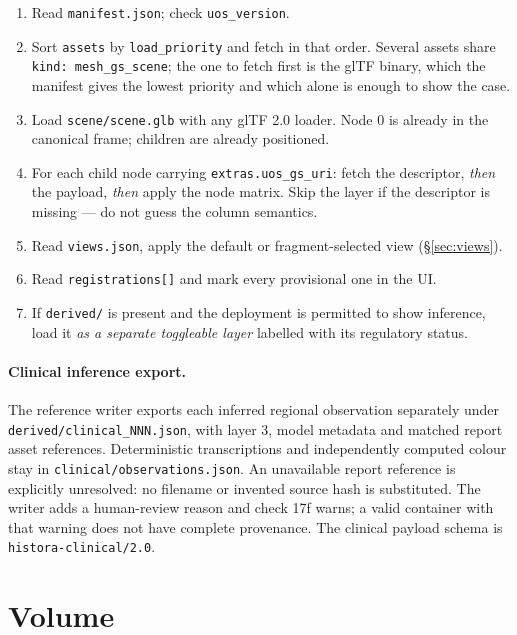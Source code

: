 \documentclass[11pt,a4paper]{article}
\newcommand{\code}[1]{\texttt{\small #1}}
\begin{document}
\begin{enumerate}
  \item Read \code{manifest.json}; check \code{uos\_version}.
  \item Sort \code{assets} by \code{load\_priority} and fetch in that order. Several
  assets share \code{kind: mesh\_gs\_scene}; the one to fetch first is the glTF binary,
  which the manifest gives the lowest priority and which alone is enough to show the case.
  \item Load \code{scene/scene.glb} with any glTF 2.0 loader. Node 0 is already in the
  canonical frame; children are already positioned.
  \item For each child node carrying \code{extras.uos\_gs\_uri}: fetch the descriptor,
  \emph{then} the payload, \emph{then} apply the node matrix. Skip the layer if the
  descriptor is missing --- do not guess the column semantics.
  \item Read \code{views.json}, apply the default or fragment-selected view
  (\S\ref{sec:views}).
  \item Read \code{registrations[]} and mark every provisional one in the UI.
  \item If \code{derived/} is present and the deployment is permitted to show inference,
  load it \emph{as a separate toggleable layer} labelled with its regulatory status.
\end{enumerate}

\paragraph{Clinical inference export.}
The reference writer exports each inferred regional observation separately under
\code{derived/clinical\_NNN.json}, with layer 3, model metadata and matched report asset
references. Deterministic transcriptions and independently computed colour stay in
\code{clinical/observations.json}. An unavailable report reference is explicitly unresolved:
no filename or invented source hash is substituted. The writer adds a human-review reason
and check 17f warns; a valid container with that warning does not have complete provenance.
The clinical payload schema is \code{histora-clinical/2.0}.

\section{Volume}\label{sec:volume}
\end{document}
